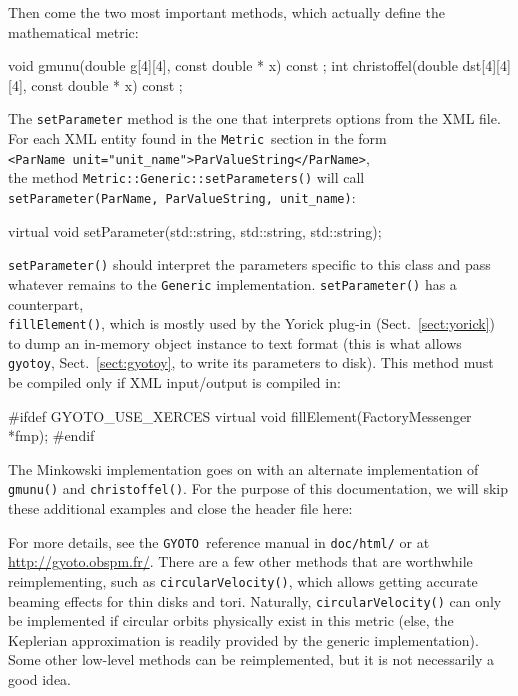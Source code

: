\documentclass[a4paper,12pt]{article}
\newcommand{\GYOTO}{\texttt{GYOTO}}
\newcommand{\Metric}{\texttt{Metric}}
\begin{document}
Then come the two most important methods, which actually define the
mathematical metric:
\begin{code}
  void gmunu(double g[4][4], const double * x) const ;
  int christoffel(double dst[4][4][4], const double * x) const ;
\end{code}
The \texttt{setParameter} method is the one that interprets options
from the XML file. For each XML entity found in the \Metric\ section
in the form\\
\texttt{<ParName unit="unit\_name">ParValueString</ParName>},\\
 the method
\texttt{Metric::Generic::setParameters()} will call\\
\texttt{setParameter(ParName, ParValueString, unit\_name)}:
\begin{code}
    virtual void setParameter(std::string, std::string, std::string);
\end{code}
\texttt{setParameter()} should interpret the parameters specific to
this class and pass whatever remains to the \texttt{Generic}
implementation. \texttt{setParameter()} has a counterpart,\\
\texttt{fillElement()}, which is mostly used by the Yorick plug-in
(Sect.~\ref{sect:yorick}) to dump an in-memory object instance to text
format (this is what allows \texttt{gyotoy}, Sect.~\ref{sect:gyotoy},
to write its parameters to disk). This method must be compiled only if
XML input/output is compiled in:
\begin{code}
  #ifdef GYOTO_USE_XERCES
    virtual void fillElement(FactoryMessenger *fmp);
  #endif
\end{code}
The Minkowski implementation goes on with an alternate implementation
of \texttt{gmunu()} and \texttt{christoffel()}. For the purpose of
this documentation, we will skip these additional examples and close
the header file here:
\begin{code}
  };
  #endif
\end{code}

For more details, see the \GYOTO\ reference manual in
\texttt{doc/html/} or at \url{http://gyoto.obspm.fr/}. There are a few
other methods that are worthwhile reimplementing, such as
\texttt{circularVelocity()}, which allows getting accurate beaming
effects for thin disks and tori. Naturally,
\texttt{circularVelocity()} can only be implemented if circular orbits
physically exist in this metric (else, the Keplerian approximation is
readily provided by the generic implementation). Some other low-level
methods can be reimplemented, but it is not necessarily a good idea.
\end{document}
